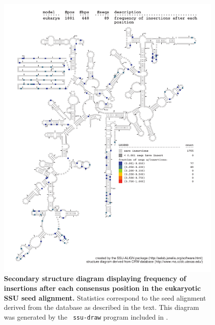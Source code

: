 \begin{figure}
\begin{center}
\includegraphics[width=5.7in]{Figures/eukarya-0p1-ifreq}
\end{center}
\caption[Secondary structure diagram displaying frequency of insertions
  after each consensus position in the eukaryotic SSU seed
  alignment]{\textbf{Secondary structure diagram displaying frequency
  of insertions after each consensus position in the eukaryotic SSU seed
  alignment.} Statistics correspond to the  seed
  alignment derived from the  database \cite{CannoneGutell02}
  as described in the text. This diagram was generated by the {\tt
  ssu-draw} program included in .}
\label{fig:eukifreq}
\end{figure}

